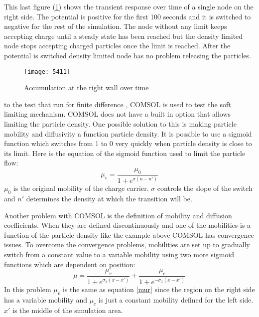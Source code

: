 \begin{doublespace}
This last figure (\ref{5411}) shows the transient response over time of a single node on the right side. The potential is positive for the first 100 seconds and it is switched to negative for the rest of the simulation. The node without any limit keeps accepting charge until a steady state has been reached but the density limited node stops accepting charged particles once the limit is reached. After the potential is switched  density limited node has no problem releasing the particles.


\begin{figure}[!htp]
\centering
\texttt{[image: 5411]}
\caption{Accumulation at the right wall over time} 
\label{5411}
\end{figure}

 to the test that  run for  finite difference , COMSOL is used to test the soft limiting mechanism. COMSOL does not have a built in option that allows limiting the particle density. One possible solution to this is making particle mobility and diffusivity a function particle density. It is possible to use a sigmoid function which switches from 1 to 0 very quickly when particle density is close to its limit. Here is the equation of the sigmoid function used to limit the particle flow:
\begin{equation}
\mu_v = \frac{\mu_{0}}{1+e^{\sigma(n-n')}}
\label{mur}
\end{equation} 
$\mu_0$ is the original mobility of the charge carrier. $\sigma$ controls the slope of the switch and $n'$ determines the density at which the transition will be. 

Another problem with COMSOL is the definition of mobility and diffusion coefficients. When they are defined discontinuously and one of the mobilities is a function of the particle density like the example above COMSOL has convergence issues. To overcome the convergence problems, mobilities are set up to gradually switch from a constant value to a variable mobility using two more sigmoid functions which are dependent on position:
\begin{equation}
\mu=\frac{\mu_{v}}{1+e^{\sigma_x(x-x')}}+\frac{\mu_{c}}{1+e^{-\sigma_x(x-x')}}
\end{equation}
In this problem $\mu_v$ is the same as equation \ref{mur} since the region on the right side has a variable mobility and $\mu_c$ is just a constant mobility defined for the left side. $x'$ is the middle of the simulation area.


\end{doublespace}
